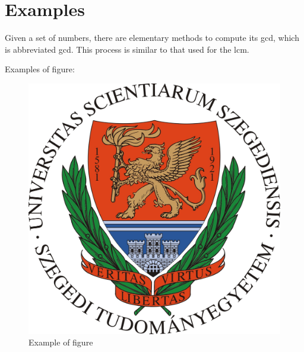 \documentclass[12pt,a4paper,twoside]{book}
\begin{document}


\nobibliography*
{}



\newpage
\thispagestyle{empty}
\mbox{}



\frontmatter
\renewcommand{\chaptermark}[1]{\markboth{#1}{}}
\renewcommand{\sectionmark}[1]{\markright{\thesection\ #1}}
\pagestyle{frontmatter}

\tableofcontents


\newpage
\thispagestyle{empty}
\mbox{}



\mainmatter
\renewcommand{\chaptermark}[1]{\markboth{#1}{}}
\renewcommand{\sectionmark}[1]{\markright{\thesection\ #1}}
\pagestyle{mainmatter}

\listoffigures
\listoftables


\printglossary[type=\acronymtype, title=Abbreviations]



\section{Examples}

Given a set of numbers, there are elementary methods to compute 
its \acrlong{gcd}, which is abbreviated \acrshort{gcd}. This process 
is similar to that used for the \acrfull{lcm}.

Examples of figure:
\begin{figure}[h]
\caption{Example of figure}
\centering
\includegraphics[width=0.3\linewidth]{Figures/szte_logo}
\end{figure}
\end{document}

